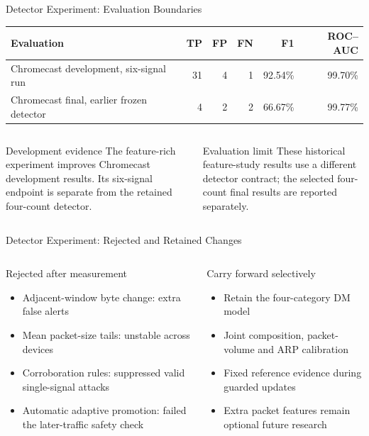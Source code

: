 \documentclass[aspectratio=169,10pt]{beamer}
\begin{document}
\begin{frame}{Detector Experiment: Evaluation Boundaries}
\centering
\small
\begin{tabular}{@{}lrrrrr@{}}
\toprule
\textbf{Evaluation} & \textbf{TP} & \textbf{FP} & \textbf{FN} & \textbf{F1} & \textbf{ROC--AUC}\\
\midrule
Chromecast development, six-signal run & 31 & 4 & 1 & 92.54\% & 99.70\%\\
Chromecast final, earlier frozen detector & 4 & 2 & 2 & 66.67\% & 99.77\%\\
\bottomrule
\end{tabular}

\vspace{0.45cm}
\begin{columns}[T,onlytextwidth]
\begin{exampleblock}{Development evidence}
The feature-rich experiment improves Chromecast development results. Its
six-signal endpoint is separate from the retained four-count detector.
\end{exampleblock}

\begin{alertblock}{Evaluation limit}
These historical feature-study results use a different detector contract;
the selected four-count final results are reported separately.
\end{alertblock}
\end{columns}
\end{frame}

\begin{frame}{Detector Experiment: Rejected and Retained Changes}
\begin{columns}[T,onlytextwidth]
\begin{alertblock}{Rejected after measurement}
\small
\begin{itemize}
  \item Adjacent-window byte change: extra false alerts
  \item Mean packet-size tails: unstable across devices
  \item Corroboration rules: suppressed valid single-signal attacks
  \item Automatic adaptive promotion: failed the later-traffic safety check
\end{itemize}
\end{alertblock}

\begin{exampleblock}{Carry forward selectively}
\small
\begin{itemize}
  \item Retain the four-category DM model
  \item Joint composition, packet-volume and ARP calibration
  \item Fixed reference evidence during guarded updates
  \item Extra packet features remain optional future research
\end{itemize}
\end{exampleblock}
\end{columns}

\end{frame}
\end{document}
